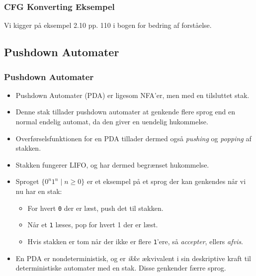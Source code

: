 \begin{frame}
	\frametitle{CFG Konverting Eksempel}
	Vi kigger på eksempel 2.10 pp. 110 i bogen for bedring af forståelse.
\end{frame}

\subsection{Pushdown Automater}%
\label{subsec:pda}


\begin{frame}[allowframebreaks]
	\frametitle{Pushdown Automater}
	\begin{itemize}
		\item Pushdown Automater (PDA) er ligesom NFA'er, men med en tilsluttet stak.
		\item Denne stak tillader pushdown automater at genkende flere sprog end en normal endelig automat, da den giver en uendelig hukommelse.
		\item Overførselsfunktionen for en PDA tillader dermed også \textit{pushing} og \textit{popping} af stakken.
		\item Stakken fungerer LIFO, og har dermed begrænset hukommelse.
		\item Sproget $\{0^{n}1^{n} \mid n \ge 0\}$ er et eksempel på et sprog der kan genkendes når vi nu har en stak:
		      \begin{itemize}
			      \item For hvert \texttt{0} der er læst, push det til stakken.
			      \item Når et \texttt{1} læses, pop for hvert 1 der er læst.
			      \item Hvis stakken er tom når der ikke er flere \texttt{1}'ere, så \textit{accepter}, ellers \textit{afvis}.
		      \end{itemize}

		\item En PDA er nondeterministisk, og er \textit{ikke} ækvivalent i sin deskriptive kraft til deterministiske automater med en stak. Disse genkender færre sprog.
	\end{itemize}
\end{frame}

